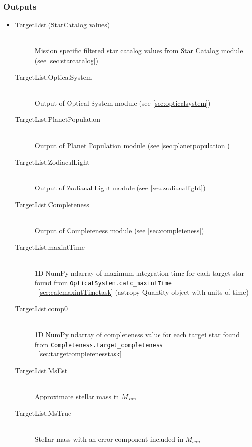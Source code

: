 \documentclass[cleanfoot]{asme2ej}
\begin{document}
\subsubsection*{Outputs}
\begin{itemize}
    \item 
    \begin{description}
        \item[TargetList.(StarCatalog values)] \hfill \\
        Mission specific filtered star catalog values from Star Catalog module (see \ref{sec:starcatalog})
        \item[TargetList.OpticalSystem] \hfill \\
        Output of Optical System module (see \ref{sec:opticalsystem})
        \item[TargetList.PlanetPopulation] \hfill \\
        Output of Planet Population module (see \ref{sec:planetpopulation})
        \item[TargetList.ZodiacalLight] \hfill \\
        Output of Zodiacal Light module (see \ref{sec:zodiacallight})
        \item[TargetList.Completeness] \hfill \\
        Output of Completeness module (see \ref{sec:completeness})
        \item[TargetList.maxintTime] \hfill \\
        1D NumPy ndarray of maximum integration time for each target star found from \verb+OpticalSystem.calc_maxintTime+ ~\ref{sec:calcmaxintTimetask} (astropy Quantity object with units of time)
        \item[TargetList.comp0] \hfill \\
        1D NumPy ndarray of completeness value for each target star found from \verb+Completeness.target_completeness+ ~\ref{sec:targetcompletenesstask}
        \item[TargetList.MsEst] \hfill \\
        Approximate stellar mass in $ M_{sun} $
        \item[TargetList.MsTrue] \hfill \\
        Stellar mass with an error component included in $ M_{sun} $
    \end{description}
\end{itemize}

\end{document}

